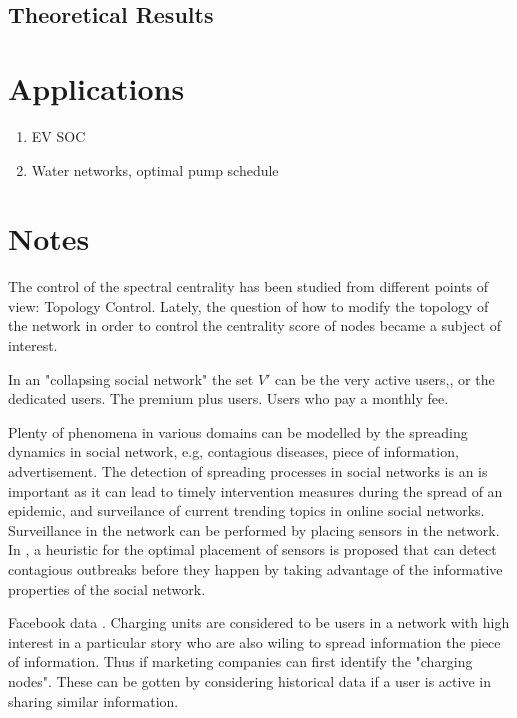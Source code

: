 \documentclass[envcountsame]{llncs}
\begin{document}
    \subsection{Theoretical Results}
	\section{Applications}
    \begin{enumerate}
    \item EV SOC
    \item Water networks, optimal pump schedule 
        \end{enumerate}

    \section{Notes}
    The control of the spectral centrality has been studied from different points of view:
    Topology Control. Lately, the question of how to modify the topology of the network in order to control the centrality
score of nodes became a subject of interest.

In an "collapsing social network" the set $V'$ can be the very active users,, or the dedicated users. The premium plus users. Users who pay a monthly fee.


\cite{pei2015detecting} Plenty of phenomena in various domains can be modelled by the spreading dynamics in social network, e.g, contagious diseases, piece of information, advertisement. The detection of spreading processes in social networks is an is important as it can lead to timely intervention measures during the spread of an epidemic, and surveilance of current trending topics in online social networks. Surveillance in the network can be performed by placing sensors in the network. In \citep{leskovec2007cost}, a heuristic for the optimal placement of sensors is proposed that can detect contagious outbreaks before they happen by taking advantage of the informative properties of the social network.
    
 Facebook data \citep{viswanath-2009-activity}. Charging units are considered to be users in a network with high interest in a particular story who are also wiling to spread information the piece of information. Thus if marketing companies can first identify the "charging nodes". These can be gotten by considering historical data if a user is active in sharing similar information. 
 
\end{document}

